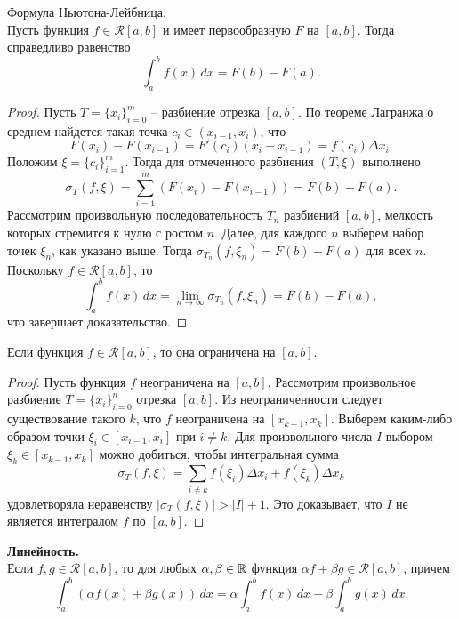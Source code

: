     \begin{theorem}{Формула Ньютона-Лейбница.}\\
        Пусть функция $f \in \mathcal{R}[a, b]$ и имеет первообразную $F$ на $[a, b]$. Тогда справедливо равенство
        \[\int_{a}^{b} f(x) \,dx = F(b) - F(a).\]
    \end{theorem}

    \begin{proof}
        Пусть $T = \{x_{i}\}_{i=0}^{m}$ -- разбиение отрезка $[a, b]$. По теореме Лагранжа о среднем найдется такая точка $c_{i} \in (x_{i-1}, x_{i})$, что 
        \[F(x_{i}) - F(x_{i-1}) = F'(c_{i})(x_{i} - x_{i-1}) = f(c_{i}) \Delta x_{i}.\]
        Положим $\xi = \{c_{i}\}_{i=1}^{m}$. Тогда для отмеченного разбиения $(T, \xi)$ выполнено
        \[\sigma_{T}(f, \xi) = \sum_{i=1}^{m}(F(x_{i}) - F(x_{i-1})) = F(b) - F(a).\]
        Рассмотрим произвольную последовательность $T_{n}$ разбиений $[a, b]$, мелкость которых стремится к нулю с ростом $n$. Далее, для каждого $n$ выберем набор точек $\xi_{n}$, как указано выше. Тогда $\sigma_{T_{n}}(f, \xi_{n}) = F(b) - F(a)$ для всех $n$. Поскольку $f \in \mathcal{R}[a, b]$, то 
        \[\int_{a}^{b} f(x) \,dx = \lim_{n \to \infty} \sigma_{T_{n}}(f, \xi_{n}) = F(b) - F(a),\]
        что завершает доказательство.
    \end{proof}

    \begin{lemma}
        Если функция $f \in \mathcal{R} [a, b]$, то она ограничена на $[a, b]$.
    \end{lemma}

    \begin{proof}
        Пусть функция $f$ неограничена на $[a, b]$. Рассмотрим произвольное разбиение $T = \{x_{i}\}_{i=0}^{n}$ отрезка $[a, b]$. Из неограниченности следует существование такого $k$, что $f$ неограничена на $[x_{k-1}, x_{k}]$. Выберем каким-либо образом точки $\xi_{i} \in [x_{i-1}, x_{i}]$ при $i \neq k$. Для произвольного числа $I$ выбором $\xi_{k} \in [x_{k-1}, x_{k}]$ можно добиться, чтобы интегральная сумма
        \[\sigma_{T}(f, \xi) = \sum_{i \neq k} f(\xi_{i}) \Delta x_{i} + f(\xi_{k}) \Delta x_{k}\]
        удовлетворяла неравенству $|\sigma_{T}(f, \xi)| > |I| + 1$. Это доказывает, что $I$ не является интегралом $f$ по $[a, b]$.
    \end{proof}

    \textbf{Линейность.}\\
    Если $f, g \in \mathcal{R}[a, b]$, то для любых $\alpha, \beta \in \mathbb{R}$ функция $\alpha f + \beta g \in \mathcal{R}[a, b]$, причем
    \[\int_{a}^{b}(\alpha f(x) + \beta g(x)) \,dx = \alpha \int_{a}^{b}f(x) \,dx + \beta \int_{a}^{b} g(x) \,dx.\]

